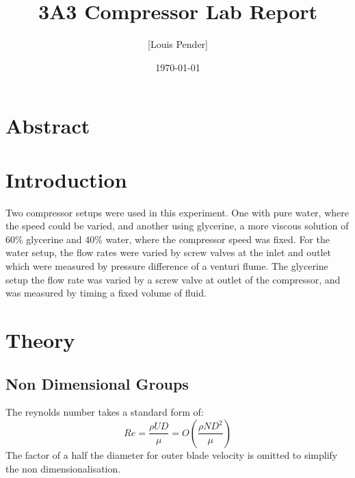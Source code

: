 \documentclass{article}
\title{3A3 Compressor Lab Report}
\author{[Louis Pender]}
\date{\today}
\begin{document}
\maketitle

\section{Abstract}

\section{Introduction}

Two compressor setups were used in this experiment.
One with pure water, where the speed could be varied, and another using glycerine, a more viscous solution of 60\%
glycerine and 40\% water, where the compressor speed was fixed.
For the water setup, the flow rates were varied by screw valves at the inlet and outlet which were measured by pressure difference of a venturi flume.
The glycerine setup the flow rate was varied by a screw valve at outlet of the compressor, and was measured by timing a fixed volume of fluid.

\section{Theory}





\subsection{Non Dimensional Groups}



The reynolds number takes a standard form of:
\begin{equation}
    Re = \frac{\rho UD}{\mu} = O\left( \frac{\rho ND^2}{\mu} \right)
\end{equation}
The factor of a half the diameter for outer blade velocity is omitted to simplify the non dimensionalisation. 
\end{document}
